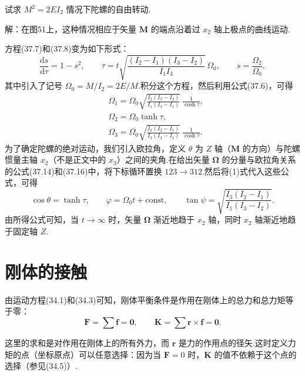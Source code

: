 \begin{xiti}
\quad 试求 $M^2=2EI_2$ 情况下陀螺的自由转动.

解：在图51上，这种情况相应于矢量 $\boldsymbol{M}$ 的端点沿着过 $x_2$ 轴上极点的曲线运动.

方程(37.7)和(37.8)变为如下形式：
\begin{equation*}
  \frac{\mathrm{d}s}{\mathrm{d}\tau}=1-s^2,\qquad
  \tau=t\sqrt{\frac{(I_2-I_1)(I_3-I_2)}{I_1I_3}}\,\Omega_0,\qquad
  s=\frac{\Omega_2}{\Omega_0},
\end{equation*}
其中引入了记号 $\Omega_0=M/I_2=2E/M$.积分这个方程，然后利用公式(37.6)，可得
\begin{equation*}
\begin{aligned}
  &\Omega_1=\Omega_0\sqrt{\frac{I_2\left(I_3-I_2\right)}
  {I_1\left(I_3-I_1\right)}}\ \frac{1}{\cosh\tau},\\
  &\Omega_2=\Omega_0\tanh\tau,\\
  &\Omega_3=\Omega_0\sqrt{\frac{I_2(I_2-I_1)}
  {I_3(I_3-I_1)}}\ \frac{1}{\cosh\tau}.
\end{aligned}
\tag{1}
\end{equation*}
为了确定陀螺的绝对运动，我们引入欧拉角，定义 $\theta$ 为 $Z$ 轴（$\boldsymbol{M}$ 的方向）与陀螺惯量主轴 $x_2$（不是正文中的 $x_3$）之间的夹角.在给出矢量 $\boldsymbol{\Omega}$ 的分量与欧拉角关系的公式(37.14)和(37.16)中，将下标循环置换 $123\to312$.然后将(1)式代入这些公式，可得
\begin{equation*}
  \cos\theta=\tanh\tau,\qquad
  \varphi=\Omega_0 t+\mathrm{const},\qquad
  \tan\psi=\sqrt{\frac{I_3(I_2-I_1)}{I_1(I_3-I_2)}}.
\end{equation*}
由所得公式可知，当 $t\to\infty$ 时，矢量 $\boldsymbol{\Omega}$ 渐近地趋于 $x_2$ 轴，同时 $x_2$ 轴渐近地趋于固定轴 $Z$.

\end{xiti}

\section{刚体的接触}

由运动方程(34.1)和(34.3)可知，刚体平衡条件是作用在刚体上的总力和总力矩等于零：
\begin{equation}
  \boldsymbol{F}=\sum\boldsymbol{f}=\boldsymbol{0},\qquad
  \boldsymbol{K}=\sum\boldsymbol{r}\times\boldsymbol{f}=\boldsymbol{0}.
\end{equation}

这里的求和是对作用在刚体上的所有外力，而 $\boldsymbol{r}$ 是力的作用点的径矢.这时定义力矩的点（坐标原点）可以任意选择：因为当 $\boldsymbol{F}=0$ 时，$\boldsymbol{K}$ 的值不依赖于这个点的选择（参见(34.5)）.


